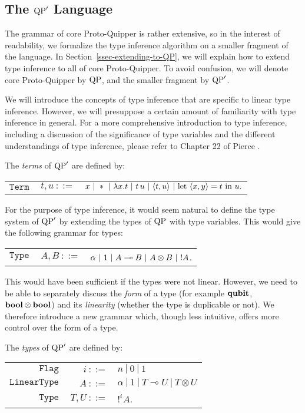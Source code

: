 
\subsection{The ${\rm QP}'$ Language}

The grammar of core Proto-Quipper is rather extensive, so in the interest of readability, we formalize the type inference algorithm on a smaller fragment of the language. In Section~\ref{ssec-extending-to-QP}, we will explain how to extend type inference to all of core Proto-Quipper. To avoid confusion, we will denote core Proto-Quipper by ${\rm QP}$, and the smaller fragment by ${\rm QP}'$.

We will introduce the concepts of type inference that are specific to
linear type inference. However, we will presuppose a certain amount of
familiarity with type inference in general.  For a more comprehensive
introduction to type inference, including a discussion of the
significance of type variables and the different understandings of
type inference, please refer to Chapter 22 of Pierce {\cite{pierce02}}.

\begin{defn} The \emph{terms} of ${\rm QP}'$ are defined by:
	\begin{center}
	\begin{tabular}{rrl}
		$\texttt{Term}$&$ ~t,u~ ::=$ & $x ~|~ * ~|~ \lambda x.t ~|~ t \, u ~|~ \langle t, u \rangle ~|~ \text{let}~ \langle x, y \rangle = t ~\text{in}~ u. $
	\end{tabular}
	\end{center}
\end{defn}

For the purpose of type inference, it would seem natural to define the type system of ${\rm QP}'$ by extending the types of ${\rm QP}$ with type variables. This would give the following grammar for types:
	\begin{center}
	\begin{tabular}{rrl}
		$\texttt{Type}$&$ ~A,B~ ::=$ & $\alpha ~|~ 1 ~|~ A \multimap B ~|~ A \otimes B ~|~ {!} A$.
	\end{tabular}
	\end{center}
This would have been sufficient if the types were not linear. However, we need to be able to separately discuss the \textit{form} of a type (for example $\textrm{\bf qubit}$, $\textrm{\bf bool} \otimes \textrm{\bf bool}$) and its \textit{linearity} (whether the type is duplicable or not). We therefore introduce a new grammar which, though less intuitive, offers more control over the form of a type.

\begin{defn} The \emph{types} of ${\rm QP}'$ are defined by:
	\begin{center}
	\begin{tabular}{rrl}
		$\texttt{Flag}$&$~i~ ::=$ & $n ~|~ 0 ~|~ 1$ \\		
		$\texttt{LinearType}$&$ ~A~ ::=$ & $\alpha ~|~ 1 ~|~ T \multimap U ~|~ T \otimes U$ \\
		$\texttt{Type}$&$ ~T,U~ ::=$ & $!^i A$.
	\end{tabular}
	\end{center}
\end{defn}

